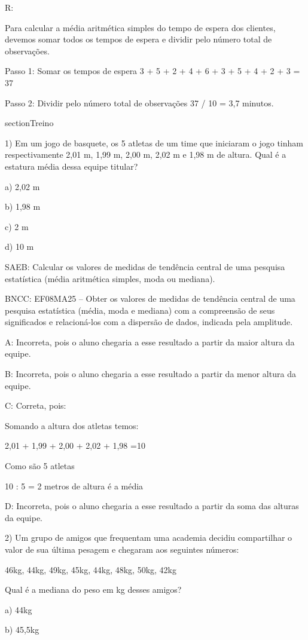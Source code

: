R:

Para calcular a média aritmética simples do tempo de espera dos
clientes, devemos somar todos os tempos de espera e dividir pelo número
total de observações.

Passo 1: Somar os tempos de espera 3 + 5 + 2 + 4 + 6 + 3 + 5 + 4 + 2 + 3
= 37

Passo 2: Dividir pelo número total de observações 37 / 10 = 3,7 minutos.

section{Treino}

1) Em um jogo de basquete, os 5 atletas de um time que iniciaram o jogo
tinham respectivamente 2,01 m, 1,99 m, 2,00 m, 2,02 m e 1,98 m de
altura. Qual é a estatura média dessa equipe titular?

a) 2,02 m

b) 1,98 m

c) 2 m

d) 10 m

SAEB: Calcular os valores de medidas de tendência central de uma
pesquisa estatística (média aritmética simples, moda ou mediana).

BNCC: EF08MA25 -- Obter os valores de medidas de tendência central de
uma pesquisa estatística (média, moda e mediana) com a compreensão de
seus significados e relacioná-los com a dispersão de dados, indicada
pela amplitude.

A: Incorreta, pois o aluno chegaria a esse resultado a partir da maior
altura da equipe.

B: Incorreta, pois o aluno chegaria a esse resultado a partir da menor
altura da equipe.

C: Correta, pois:

Somando a altura dos atletas temos:

2,01 + 1,99 + 2,00 + 2,02 + 1,98 =10

Como são 5 atletas

10 : 5 = 2 metros de altura é a média

D: Incorreta, pois o aluno chegaria a esse resultado a partir da soma
das alturas da equipe.

2) Um grupo de amigos que frequentam uma academia decidiu compartilhar o
valor de sua última pesagem e chegaram aos seguintes números:

46kg, 44kg, 49kg, 45kg, 44kg, 48kg, 50kg, 42kg

Qual é a mediana do peso em kg desses amigos?

a) 44kg

b) 45,5kg

